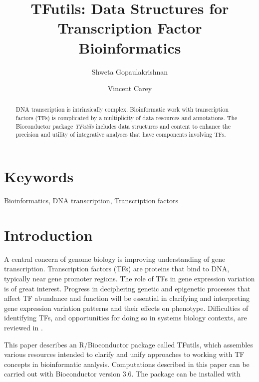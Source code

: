 \documentclass[9pt,a4paper,]{extarticle}
\begin{document}
\pagestyle{front}

\title{TFutils: Data Structures for Transcription Factor Bioinformatics}

\author[1]{Shweta Gopaulakrishnan}
\author[1]{Vincent Carey}

\maketitle
\thispagestyle{front}

\begin{abstract}
DNA transcription is intrinsically complex. Bioinformatic work with transcription factors (TFs) is complicated by a multiplicity of data resources and annotations. The Bioconductor package \emph{TFutils} includes data structures and content to enhance the precision and utility of integrative analyses that have components involving TFs.
\end{abstract}

\section*{Keywords}
Bioinformatics, DNA transcription, Transcription factors


\clearpage
\pagestyle{main}

\section{Introduction}\label{introduction}

A central concern of genome biology is improving
understanding of gene transcription. Transcription factors (TFs)
are proteins that bind to DNA, typically near gene promoter
regions. The role of TFs in gene expression variation
is of great interest. Progress in deciphering
genetic and epigenetic processes that affect TF abundance
and function will be essential in clarifying and
interpreting gene expression variation patterns
and their effects on phenotype. Difficulties
of identifying TFs, and opportunities for doing so in
systems biology contexts, are reviewed in \citet{Weirauch2014}.

This paper describes an R/Bioconductor package called
TFutils, which assembles various resources intended
to clarify and unify approaches to working with
TF concepts in bioinformatic analysis. Computations
described in this paper can be carried out with
Bioconductor version 3.6. The package can be
installed with
\end{document}
